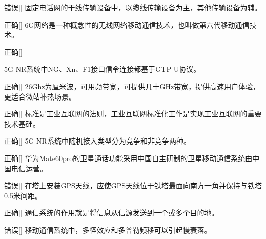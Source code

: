 \begin{choice}{\;错误\;}[]
    固定电话网的干线传输设备中，以缆线传输设备为主，其他传输设备为辅。

\end{choice}


\begin{choice}{\;正确\;}[]
    6G网络是一种概念性的无线网络移动通信技术，也叫做第六代移动通信技术。

\end{choice}

\begin{choice}{\;正确\;}[]

    5G NR系统中NG、Xn、F1接口信令连接都基于GTP-U协议。
\end{choice}


\begin{choice}{\;正确\;}[]
    26Ghz为厘米波，可用频带宽，可提供几十GHz带宽，提供高速用户体验，更适合微站补热场景。

\end{choice}

\begin{choice}{\;正确\;}[]
    标准是工业互联网的法则，工业互联网标准化工作是实现工业互联网的重要技术基础。

\end{choice}


\begin{choice}{\;正确\;}[]
    5G NR系统中随机接入类型分为竞争和非竞争两种。

\end{choice}


\begin{choice}{\;正确\;}[]
    华为Mate60pro的卫星通话功能采用中国自主研制的卫星移动通信系统由中国电信运营。

\end{choice}


\begin{choice}{\;错误\;}[]
    在塔上安装GPS天线，应使GPS天线位于铁塔最面向南方一角并保持与铁塔0.5米间距。

\end{choice}


\begin{choice}{\;正确\;}[]
    通信系统的作用就是将信息从信源发送到一个或多个目的地。

\end{choice}


\begin{choice}{\;错误\;}[]
    移动通信系统中，多径效应和多普勒频移可以引起慢衰落。

\end{choice}

